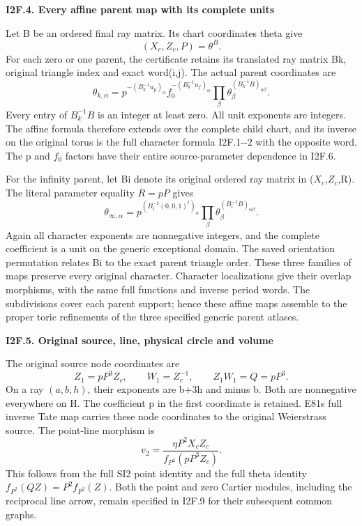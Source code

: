 \par

\medskip\noindent\textbf{I2F.4. Every affine parent map with its complete units}

\par\nobreak

Let B be an ordered final ray matrix. Its
chart coordinates theta give
\[
                      (X_c,Z_c,P)=\theta^B.
 \tag{I2F.5}
\]
For each zero or one parent, the certificate
retains its translated ray matrix Bk, original
triangle index and exact word(i,j). The actual
parent coordinates are
\[
 \theta_{k,\alpha}=
 p^{-(B_k^{-1}u_p)_\alpha}
 f_0^{-(B_k^{-1}u_f)_\alpha}
 \prod_\beta\theta_\beta^{(B_k^{-1}B)_{\alpha\beta}}.
 \tag{I2F.6}
\]
Every entry of \(B_{k}^{-1} B\) is an integer at least
zero. All unit exponents are integers. The
affine formula therefore extends over the
complete child chart, and its inverse on the
original torus is the full character formula
I2F.1-\/-2 with the opposite word. The p and \(f_{0}\)
factors have their entire source-parameter
dependence in I2F.6.

For the infinity parent, let Bi denote its
original ordered ray matrix in (\(X_c\),\(Z_c\),R).
The literal parameter equality \(R=pP\) gives
\[
 \theta_{\infty,\alpha}=
 p^{(B_i^{-1}(0,0,1)^t)_\alpha}
 \prod_\beta\theta_\beta^{(B_i^{-1}B)_{\alpha\beta}}.
 \tag{I2F.7}
\]
Again all character exponents are nonnegative
integers, and the complete coefficient is a
unit on the generic exceptional domain. The
saved orientation permutation relates Bi to
the exact parent triangle order. These three
families of maps preserve every original
character. Character localizations give their
overlap morphisms, with the same full functions
and inverse period words. The subdivisions
cover each parent support; hence these affine
maps assemble to the proper toric refinements
of the three specified generic parent atlases.

\par

\medskip\noindent\textbf{I2F.5. Original source, line, physical circle and volume}

\par\nobreak

The original source node coordinates are
\[
 Z_1=pP^3Z_c,\qquad W_1=Z_c^{-1},\qquad
 Z_1W_1=Q=pP^3.
 \tag{I2F.8}
\]
On a ray \((a,b,h)\), their exponents are b+3h
and minus b. Both are nonnegative everywhere
on H. The coefficient p in the first coordinate
is retained. E81\textquotesingle s full inverse Tate map carries
these node coordinates to the original
Weierstrass source. The point-line morphism is
\[
 v_2=\frac{\eta P^2X_cZ_c}{f_{P^2}(pP^3Z_c)}.
 \tag{I2F.9}
\]
This follows from the full SI2 point identity and the full theta
identity \(f_{P^{2}}(QZ)=P^{2} f_{P^{2}}(Z)\). Both the
point and zero Cartier modules, including the
reciprocal line arrow, remain specified in
I2F.9 for their subsequent common graphs.

